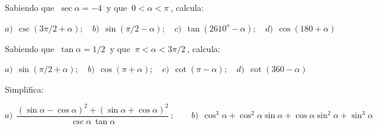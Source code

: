 \begin{mipropuesto}

Sabiendo que $\ \sec \alpha=-4\ $	y que $\ 0<\alpha<\pi\ $, calcula: 

\vspace{1mm} $a)\ \ \csc(3\pi/2+\alpha);\quad b)\ \ \sin(\pi/2-\alpha);\quad c)\ \ \tan(2610^o-\alpha); \quad d)\ \ \cos(180+\alpha)$
\end{mipropuesto}

\vspace{-8mm}
\begin{flushright}
\begin{footnotesize} \textcolor{gris}{}	\end{footnotesize}
\end{flushright}



\begin{mipropuesto}

Sabiendo que $\ \tan \alpha=1/2\ $ y que $\ \pi < \alpha < 3\pi/2\ $, calcula:

\vspace{1mm}$a)\ \ \sin(\pi/2+\alpha);\quad b)\ \ \cos(\pi+\alpha);\quad c)\ \ \cot(\pi-\alpha);\quad d)\ \ \cot(360-\alpha)$	
\end{mipropuesto}

\vspace{-8mm}
\begin{flushright}
\begin{footnotesize} \textcolor{gris}{}	\end{footnotesize}
\end{flushright}



\begin{mipropuesto}

Simplifica: 

\vspace{1mm} $ a) \ \ \dfrac{(\sin \alpha-\cos \alpha)^2+(\sin \alpha+\cos \alpha)^2}{\csc \alpha \, \tan \alpha} \, ; \qquad b) \ \ \cos^3 \alpha+ \cos^2 \alpha \sin \alpha + \cos \alpha \sin^2 \alpha + \sin^3 \alpha $ 	
\end{mipropuesto}

\vspace{-8mm}
\begin{flushright}
\begin{footnotesize} \textcolor{gris}{}	\end{footnotesize}
\end{flushright}




